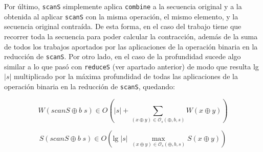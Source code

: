 \documentclass[a4paper,10pt]{article}
\begin{document}
Por último, \texttt{scanS} simplemente aplica \texttt{combine} a la secuencia original
y a la obtenida al aplicar \texttt{scanS} con la misma operación, el mismo elemento,
y la secuencia original contraída. De esta forma, en el caso del trabajo tiene
que recorrer toda la secuencia para poder calcular la contracción, además de la
suma de todos los trabajos aportados por las aplicaciones de la operación binaria
en la reducción de \texttt{scanS}. Por otro lado, en el caso de la profundidad
sucede algo similar a lo que pasó con \texttt{reduceS} (ver apartado anterior) de
modo que resulta lg $\vert s \vert$ multiplicado por la máxima profundidad de
todas las aplicaciones de la operación binaria en la reducción de \texttt{scanS},
quedando:

\begin{equation*}
    W \left( scanS \oplus b \; s \right) \in
    O \left( \vert s \vert + \sum_{(x \oplus y) \in \mathcal{O}_s(\oplus,b,s)} W \left( x \oplus y \right) \right)
\end{equation*}

\begin{equation*}
    S \left( scanS \oplus b \; s \right) \in
    O \left( \text{lg} \; \vert s \vert \; \max_{(x \oplus y) \in \mathcal{O}_s(\oplus,b,s)} S \left( x \oplus y \right) \right)
\end{equation*}
\end{document}
